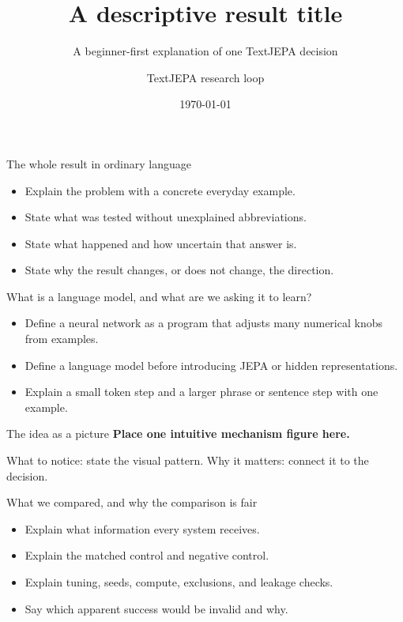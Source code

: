\documentclass[aspectratio=169,11pt]{beamer}
\title{A descriptive result title}
\subtitle{A beginner-first explanation of one TextJEPA decision}
\author{TextJEPA research loop}
\date{\today}
\begin{document}
\frame{\titlepage}

\begin{frame}{The whole result in ordinary language}
  \begin{itemize}
    \item Explain the problem with a concrete everyday example.
    \item State what was tested without unexplained abbreviations.
    \item State what happened and how uncertain that answer is.
    \item State why the result changes, or does not change, the direction.
  \end{itemize}
\end{frame}

\begin{frame}{What is a language model, and what are we asking it to learn?}
  \begin{itemize}
    \item Define a neural network as a program that adjusts many numerical knobs from examples.
    \item Define a language model before introducing JEPA or hidden representations.
    \item Explain a small token step and a larger phrase or sentence step with one example.
  \end{itemize}
\end{frame}

\begin{frame}{The idea as a picture}
  \centering
  \vspace{2cm}
  \textbf{Place one intuitive mechanism figure here.}

  \vspace{1em}
  \small What to notice: state the visual pattern. Why it matters: connect it to the decision.
\end{frame}

\begin{frame}{What we compared, and why the comparison is fair}
  \begin{itemize}
    \item Explain what information every system receives.
    \item Explain the matched control and negative control.
    \item Explain tuning, seeds, compute, exclusions, and leakage checks.
    \item Say which apparent success would be invalid and why.
  \end{itemize}
\end{frame}
\end{document}
